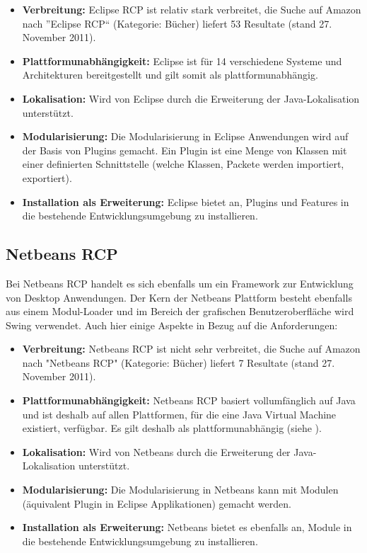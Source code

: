 \begin{itemize}
\item \textbf{Verbreitung:} Eclipse RCP ist relativ stark verbreitet, die Suche auf Amazon nach ''Eclipse RCP`` (Kategorie: Bücher) liefert 53 Resultate (stand 27. November 2011).
\item \textbf{Plattformunabhängigkeit:} Eclipse ist für 14 verschiedene Systeme und Architekturen bereitgestellt und gilt somit als plattformunabhängig\cite{wiki:eclipse}.
\item \textbf{Lokalisation:} Wird von Eclipse durch die Erweiterung der Java-Lokalisation unterstützt.
\item \textbf{Modularisierung:} Die Modularisierung in Eclipse Anwendungen wird auf der Basis von Plugins gemacht. Ein Plugin ist eine Menge von Klassen mit einer definierten Schnittstelle (welche Klassen, Packete werden importiert, exportiert).
\item \textbf{Installation als Erweiterung:} Eclipse bietet an, Plugins und Features in die bestehende Entwicklungsumgebung zu installieren.
\end{itemize}

\subsection{Netbeans RCP}
Bei Netbeans RCP handelt es sich ebenfalls um ein Framework zur Entwicklung von Desktop Anwendungen. Der Kern der Netbeans Plattform besteht ebenfalls aus einem Modul-Loader und im Bereich der grafischen Benutzeroberfläche wird Swing verwendet.  Auch hier einige Aspekte in Bezug auf die Anforderungen:
\begin{itemize}
\item \textbf{Verbreitung:} Netbeans RCP ist nicht sehr verbreitet, die Suche auf Amazon nach "Netbeans RCP" (Kategorie: Bücher) liefert 7 Resultate (stand 27. November 2011).
\item \textbf{Plattformunabhängigkeit:} Netbeans RCP basiert vollumfänglich auf Java und ist deshalb auf allen Plattformen, für die eine Java Virtual Machine existiert, verfügbar. Es gilt deshalb als plattformunabhängig (siehe \cite{wiki:netbeans}).
\item \textbf{Lokalisation:} Wird von Netbeans durch die Erweiterung der Java-Lokalisation unterstützt.
\item \textbf{Modularisierung:} Die Modularisierung in Netbeans kann mit Modulen (äquivalent Plugin in Eclipse Applikationen) gemacht werden.
\item \textbf{Installation als Erweiterung:} Netbeans bietet es ebenfalls an, Module in die bestehende Entwicklungsumgebung zu installieren.
\end{itemize}

